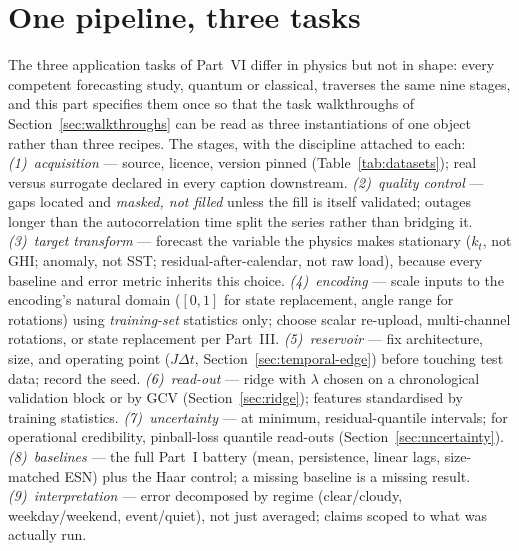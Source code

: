 
\section{One pipeline, three tasks}
\label{sec:pipeline-spec}

The three application tasks of Part~VI differ in physics but not in shape:
every competent forecasting study, quantum or classical, traverses the same
nine stages, and this part specifies them once so that the task walkthroughs
of Section~\ref{sec:walkthroughs} can be read as three instantiations of one
object rather than three recipes. The stages, with the discipline attached to
each: \emph{(1)~acquisition} --- source, licence, version pinned
(Table~\ref{tab:datasets}); real versus surrogate declared in every caption
downstream. \emph{(2)~quality control} --- gaps located and \emph{masked, not
filled} unless the fill is itself validated; outages longer than the
autocorrelation time split the series rather than bridging it.
\emph{(3)~target transform} --- forecast the variable the physics makes
stationary ($k_t$, not GHI; anomaly, not SST; residual-after-calendar, not
raw load), because every baseline and error metric inherits this choice.
\emph{(4)~encoding} --- scale inputs to the encoding's natural domain
($[0,1]$ for state replacement, angle range for rotations) using
\emph{training-set} statistics only; choose scalar re-upload, multi-channel
rotations, or state replacement per Part~III. \emph{(5)~reservoir} --- fix
architecture, size, and operating point ($J\Delta t$, Section~\ref{sec:temporal-edge})
before touching test data; record the seed. \emph{(6)~read-out} ---
ridge with $\lambda$ chosen on a chronological validation block or by GCV
(Section~\ref{sec:ridge}); features standardised by training statistics.
\emph{(7)~uncertainty} --- at minimum, residual-quantile intervals; for
operational credibility, pinball-loss quantile read-outs
(Section~\ref{sec:uncertainty}). \emph{(8)~baselines} --- the full Part~I
battery (mean, persistence, linear lags, size-matched ESN) plus the Haar
control; a missing baseline is a missing result. \emph{(9)~interpretation} ---
error decomposed by regime (clear/cloudy, weekday/weekend, event/quiet), not
just averaged; claims scoped to what was actually run.

